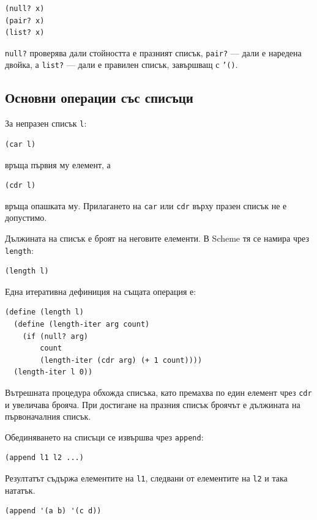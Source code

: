 \begin{verbatim}
(null? x)
(pair? x)
(list? x)
\end{verbatim}

\texttt{null?} проверява дали стойността е празният списък, \texttt{pair?} --- дали е наредена двойка, а \texttt{list?} --- дали е правилен списък, завършващ с \texttt{'()}.

\subsection{Основни операции със списъци}\label{s:20.2.3}

За непразен списък \texttt{l}:

\begin{verbatim}
(car l)
\end{verbatim}

връща първия му елемент, а

\begin{verbatim}
(cdr l)
\end{verbatim}

връща опашката му. Прилагането на \texttt{car} или \texttt{cdr} върху празен списък не е допустимо.

Дължината на списък е броят на неговите елементи. В Scheme тя се намира чрез \texttt{length}:

\begin{verbatim}
(length l)
\end{verbatim}

Една итеративна дефиниция на същата операция е:

\begin{verbatim}
(define (length l)
  (define (length-iter arg count)
    (if (null? arg)
        count
        (length-iter (cdr arg) (+ 1 count))))
  (length-iter l 0))
\end{verbatim}

Вътрешната процедура обхожда списъка, като премахва по един елемент чрез \texttt{cdr} и увеличава брояча. При достигане на празния списък броячът е дължината на първоначалния списък.

Обединяването на списъци се извършва чрез \texttt{append}:

\begin{verbatim}
(append l1 l2 ...)
\end{verbatim}

Резултатът съдържа елементите на \texttt{l1}, следвани от елементите на \texttt{l2} и така нататък.

\begin{verbatim}
(append '(a b) '(c d))
\end{verbatim}

